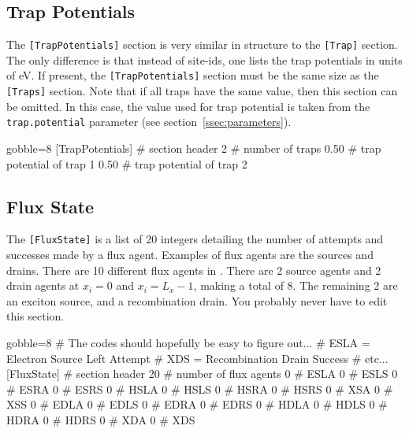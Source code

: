 \subsection{Trap Potentials}
    \label{ssec:trap}
    The \verb|[TrapPotentials]| section is very similar in structure to
        the \verb|[Trap]| section.
    The only difference is that instead of site-ids, one lists the
        trap potentials in units of \si{eV}.
    If present, the \verb|[TrapPotentials]| section must be the same
        size as the \verb|[Traps]| section.
    Note that if all traps have the same value, then this section
        can be omitted.
    In this case, the value used for trap potential is taken from the
        \verb|trap.potential| parameter (see section~\ref{ssec:parameters}).

    \begin{bashcode*}{gobble=8}
        [TrapPotentials]    # section header
        2                   # number of traps
        0.50                # trap potential of trap 1
        0.50                # trap potential of trap 2
    \end{bashcode*}

\newpage
\subsection{Flux State}
    \label{ssec:flux}
    The \verb|[FluxState]| is a list of 20 integers detailing the
        number of attempts and successes made by a flux agent.
    Examples of flux agents are the sources and drains.
    There are 10 different flux agents in \Langmuir.
    There are 2 source agents and 2 drain agents at $x_{i} = 0$ and
        $x_{i} = L_{x} - 1$, making a total of 8.
    The remaining 2 are an exciton source, and a recombination drain.
    You probably never have to edit this section.

    \begin{bashcode*}{gobble=8}
        # The codes should hopefully be easy to figure out...
        # ESLA = Electron Source Left Attempt
        # XDS  = Recombination Drain Success
        # etc...
        [FluxState]    # section header
        20             # number of flux agents
        0              # ESLA
        0              # ESLS
        0              # ESRA
        0              # ESRS
        0              # HSLA
        0              # HSLS
        0              # HSRA
        0              # HSRS
        0              # XSA
        0              # XSS
        0              # EDLA
        0              # EDLS
        0              # EDRA
        0              # EDRS
        0              # HDLA
        0              # HDLS
        0              # HDRA
        0              # HDRS
        0              # XDA
        0              # XDS
    \end{bashcode*}

